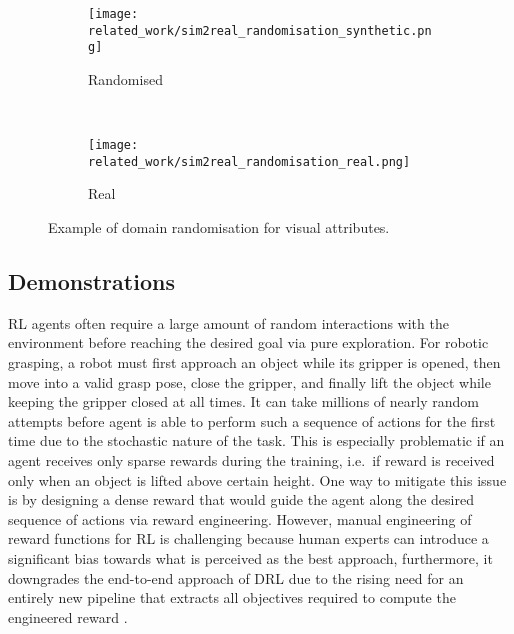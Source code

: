 \begin{figure}[ht]
    \centering
    \begin{subfigure}[ht]{0.745\textwidth}
        \centering
        \texttt{[image: related\_work/sim2real\_randomisation\_synthetic.png]}
        \caption*{Randomised}
    \end{subfigure}%
    ~
    \begin{subfigure}[ht]{0.245\textwidth}
        \centering
        \texttt{[image: related\_work/sim2real\_randomisation\_real.png]}
        \caption*{Real}
    \end{subfigure}%
    \caption{Example of domain randomisation for visual attributes.~\protect\cite{tobin_domain_2017}}
    \label{fig:sim2real_domain_randomisation}
\end{figure}


\subsection{Demonstrations}

RL agents often require a large amount of random interactions with the environment before reaching the desired goal via pure exploration. For robotic grasping, a robot must first approach an object while its gripper is opened, then move into a valid grasp pose, close the gripper, and finally lift the object while keeping the gripper closed at all times. It can take millions of nearly random attempts before agent is able to perform such a sequence of actions for the first time due to the stochastic nature of the task. This is especially problematic if an agent receives only sparse rewards during the training, i.e.~if reward is received only when an object is lifted above certain height. One way to mitigate this issue is by designing a dense reward that would guide the agent along the desired sequence of actions via reward engineering. However, manual engineering of reward functions for RL is challenging because human experts can introduce a significant bias towards what is perceived as the best approach, furthermore, it downgrades the end-to-end approach of DRL due to the rising need for an entirely new pipeline that extracts all objectives required to compute the engineered reward \cite{singh_end--end_2019}.

